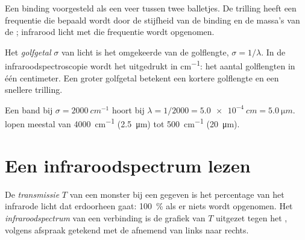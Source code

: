 \begin{omfigure}

{\small Een binding voorgesteld als een veer tussen twee balletjes. De
trilling heeft een frequentie die bepaald wordt door de stijfheid van de
binding en de massa's van de ; infrarood licht met die frequentie
wordt opgenomen.}
\end{omfigure}

\begin{definition}[Golfgetal]\label{def:g11:infrared:wavenumber}
Het \emph{golfgetal} $\sigma$ van licht is het omgekeerde
van de golflengte, $\sigma = 1/\lambda$. In de infraroodspectroscopie
wordt het uitgedrukt in \si{cm^{-1}}: het aantal golflengten in één
centimeter. Een groter golfgetal betekent een kortere golflengte en een
snellere trilling.
\end{definition}

\begin{example}\label{ex:g11:infrared:convert}
Een band bij $\sigma = \qty{2000}{cm^{-1}}$ hoort bij
$\lambda = 1/2000 = \qty{5.0e-4}{cm} = \qty{5.0}{\micro m}$.
 lopen meestal van \qty{4000}{cm^{-1}}
(\qty{2.5}{\micro m}) tot \qty{500}{cm^{-1}} (\qty{20}{\micro m}).
\end{example}

\section{Een infraroodspectrum lezen}

\begin{definition}\label{def:g11:infrared:spectrum}
De \emph{transmissie} $T$ van een monster bij een
gegeven  is het percentage van het infrarode licht dat erdoorheen
gaat: \qty{100}{\percent} als er niets wordt opgenomen. Het
\emph{infraroodspectrum} van een verbinding is
de grafiek van $T$ uitgezet tegen het , volgens afspraak
getekend met de  afnemend van links naar rechts.
\end{definition}

